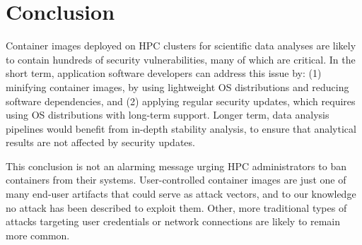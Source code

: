 \documentclass[a4paper,num-refs]{oup-contemporary}
\begin{document}
\section{Conclusion}

Container images deployed on HPC clusters for scientific data analyses are
likely to contain hundreds of security vulnerabilities, many of which are
critical. In the short term, application software developers can address
this issue by: (1) minifying container images, by using lightweight OS
distributions and reducing software dependencies, and (2) applying regular
security updates, which requires using OS distributions with long-term
support. Longer term, data analysis pipelines would benefit from in-depth
stability analysis, to ensure that analytical results are not affected by
security updates.

This conclusion is not an alarming message urging HPC administrators  
to ban containers from their systems. User-controlled container images are
just one of many end-user artifacts that could serve as attack vectors,
and to our knowledge no attack has been described to exploit them. Other,
more traditional types of attacks targeting user credentials or network
connections are likely to remain more common.


\end{document}
